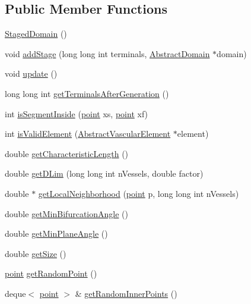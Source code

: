 \subsection*{Public Member Functions}
\begin{DoxyCompactItemize}
\item 
\hyperlink{class_staged_domain_a48d3fc928f1c52c13adc66761fd45353}{Staged\+Domain} ()
\item 
void \hyperlink{class_staged_domain_a3b206c2ba98d6fca73dd2b76689f9742}{add\+Stage} (long long int terminals, \hyperlink{class_abstract_domain}{Abstract\+Domain} $\ast$domain)
\item 
void \hyperlink{class_staged_domain_abacd2429b605ac8ae9c94701485f4df0}{update} ()
\item 
long long int \hyperlink{class_staged_domain_ac179c1e1d0a2aac78093bd71d083811f}{get\+Terminals\+After\+Generation} ()
\item 
int \hyperlink{class_staged_domain_a2f13523c9e014efd270df926aabdbc76}{is\+Segment\+Inside} (\hyperlink{structpoint}{point} xs, \hyperlink{structpoint}{point} xf)
\item 
int \hyperlink{class_staged_domain_a083dae621ca3d910b23f5cd85ba23d65}{is\+Valid\+Element} (\hyperlink{class_abstract_vascular_element}{Abstract\+Vascular\+Element} $\ast$element)
\item 
double \hyperlink{class_staged_domain_aec389e04bcd549140b29dbc9c56cf29b}{get\+Characteristic\+Length} ()
\item 
double \hyperlink{class_staged_domain_a4bb50d4e92dc81e0c87aa0b4190138b3}{get\+D\+Lim} (long long int n\+Vessels, double factor)
\item 
double $\ast$ \hyperlink{class_staged_domain_ad8107b681fcba3794ea4cd9b1a5a2edd}{get\+Local\+Neighborhood} (\hyperlink{structpoint}{point} p, long long int n\+Vessels)
\item 
double \hyperlink{class_staged_domain_a139146506055f007980898b55fc894e0}{get\+Min\+Bifurcation\+Angle} ()
\item 
double \hyperlink{class_staged_domain_a211adf0d69765f74dc13c3219a670c00}{get\+Min\+Plane\+Angle} ()
\item 
double \hyperlink{class_staged_domain_a807d7b1c56b5a6ccce593513baebf3b1}{get\+Size} ()
\item 
\hyperlink{structpoint}{point} \hyperlink{class_staged_domain_a90178baeab98fe08850977e7924c2780}{get\+Random\+Point} ()
\item 
deque$<$ \hyperlink{structpoint}{point} $>$ \& \hyperlink{class_staged_domain_a5a5398712e064cbd706f701c8294bbad}{get\+Random\+Inner\+Points} ()

\end{DoxyCompactItemize}
